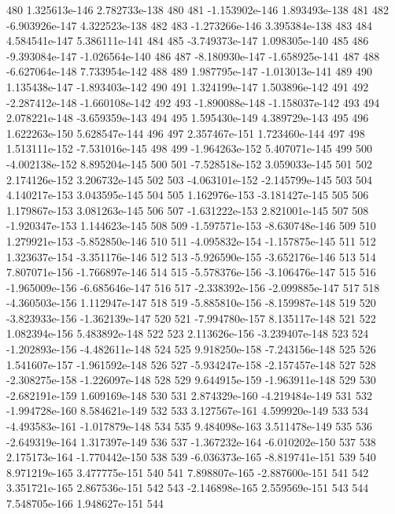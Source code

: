 \documentclass{article}
\begin{document}
\begin{Schunk}
\begin{Soutput}
480   1.325613e-146  2.782733e-138  480
481  -1.153902e-146  1.893493e-138  481
482  -6.903926e-147  4.322523e-138  482
483  -1.273266e-146  3.395384e-138  483
484   4.584541e-147  5.386111e-141  484
485  -3.749373e-147  1.098305e-140  485
486  -9.393084e-147 -1.026564e-140  486
487  -8.180930e-147 -1.658925e-141  487
488  -6.627064e-148  7.733954e-142  488
489   1.987795e-147 -1.013013e-141  489
490   1.135438e-147 -1.893403e-142  490
491   1.324199e-147  1.503896e-142  491
492  -2.287412e-148 -1.660108e-142  492
493  -1.890088e-148 -1.158037e-142  493
494   2.078221e-148 -3.659359e-143  494
495   1.595430e-149  4.389729e-143  495
496   1.622263e-150  5.628547e-144  496
497   2.357467e-151  1.723460e-144  497
498   1.513111e-152 -7.531016e-145  498
499  -1.964263e-152  5.407071e-145  499
500  -4.002138e-152  8.895204e-145  500
501  -7.528518e-152  3.059033e-145  501
502   2.174126e-152  3.206732e-145  502
503  -4.063101e-152 -2.145799e-145  503
504   4.140217e-153  3.043595e-145  504
505   1.162976e-153 -3.181427e-145  505
506   1.179867e-153  3.081263e-145  506
507  -1.631222e-153  2.821001e-145  507
508  -1.920347e-153  1.144623e-145  508
509  -1.597571e-153 -8.630748e-146  509
510   1.279921e-153 -5.852850e-146  510
511  -4.095832e-154 -1.157875e-145  511
512   1.323637e-154 -3.351176e-146  512
513  -5.926590e-155 -3.652176e-146  513
514   7.807071e-156 -1.766897e-146  514
515  -5.578376e-156 -3.106476e-147  515
516  -1.965009e-156 -6.685646e-147  516
517  -2.338392e-156 -2.099885e-147  517
518  -4.360503e-156  1.112947e-147  518
519  -5.885810e-156 -8.159987e-148  519
520  -3.823933e-156 -1.362139e-147  520
521  -7.994780e-157  8.135117e-148  521
522   1.082394e-156  5.483892e-148  522
523   2.113626e-156 -3.239407e-148  523
524  -1.202893e-156 -4.482611e-148  524
525   9.918250e-158 -7.243156e-148  525
526   1.541607e-157 -1.961592e-148  526
527  -5.934247e-158 -2.157457e-148  527
528  -2.308275e-158 -1.226097e-148  528
529   9.644915e-159 -1.963911e-148  529
530  -2.682191e-159  1.609169e-148  530
531   2.874329e-160 -4.219484e-149  531
532  -1.994728e-160  8.584621e-149  532
533   3.127567e-161  4.599920e-149  533
534  -4.493583e-161 -1.017879e-148  534
535   9.484098e-163  3.511478e-149  535
536  -2.649319e-164  1.317397e-149  536
537  -1.367232e-164 -6.010202e-150  537
538   2.175173e-164 -1.770442e-150  538
539  -6.036373e-165 -8.819741e-151  539
540   8.971219e-165  3.477775e-151  540
541   7.898807e-165 -2.887600e-151  541
542   3.351721e-165  2.867536e-151  542
543  -2.146898e-165  2.559569e-151  543
544   7.548705e-166  1.948627e-151  544

\end{Soutput}
\end{Schunk}
\end{document}
